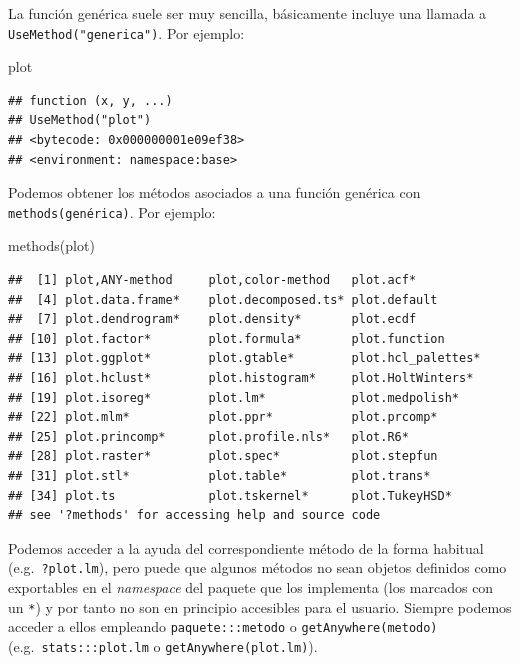 \documentclass[
]{book}
\newenvironment{Shaded}{\begin{snugshade}}{\end{snugshade}}
\newcommand{\FunctionTok}[1]{\textcolor[rgb]{0.00,0.00,0.00}{#1}}
\newcommand{\NormalTok}[1]{#1}
\theoremstyle{break}
\theoremstyle{nonumberplain}
\begin{document}
La función genérica suele ser muy sencilla, básicamente incluye una llamada a \texttt{UseMethod("generica")}.
Por ejemplo:

\begin{Shaded}
\begin{Highlighting}[]
\NormalTok{plot}
\end{Highlighting}
\end{Shaded}

\begin{verbatim}
## function (x, y, ...) 
## UseMethod("plot")
## <bytecode: 0x000000001e09ef38>
## <environment: namespace:base>
\end{verbatim}

Podemos obtener los métodos asociados a una función genérica con \texttt{methods(genérica)}.
Por ejemplo:

\begin{Shaded}
\begin{Highlighting}[]
\FunctionTok{methods}\NormalTok{(plot)}
\end{Highlighting}
\end{Shaded}

\begin{verbatim}
##  [1] plot,ANY-method     plot,color-method   plot.acf*          
##  [4] plot.data.frame*    plot.decomposed.ts* plot.default       
##  [7] plot.dendrogram*    plot.density*       plot.ecdf          
## [10] plot.factor*        plot.formula*       plot.function      
## [13] plot.ggplot*        plot.gtable*        plot.hcl_palettes* 
## [16] plot.hclust*        plot.histogram*     plot.HoltWinters*  
## [19] plot.isoreg*        plot.lm*            plot.medpolish*    
## [22] plot.mlm*           plot.ppr*           plot.prcomp*       
## [25] plot.princomp*      plot.profile.nls*   plot.R6*           
## [28] plot.raster*        plot.spec*          plot.stepfun       
## [31] plot.stl*           plot.table*         plot.trans*        
## [34] plot.ts             plot.tskernel*      plot.TukeyHSD*     
## see '?methods' for accessing help and source code
\end{verbatim}

Podemos acceder a la ayuda del correspondiente método de la forma habitual (e.g.~\texttt{?plot.lm}), pero puede que algunos métodos no sean objetos definidos como exportables en el \emph{namespace} del paquete que los implementa (los marcados con un \texttt{*}) y por tanto no son en principio accesibles para el usuario.
Siempre podemos acceder a ellos empleando \texttt{paquete:::metodo} o \texttt{getAnywhere(metodo)} (e.g.~\texttt{stats:::plot.lm} o \texttt{getAnywhere(plot.lm)}).
\end{document}

